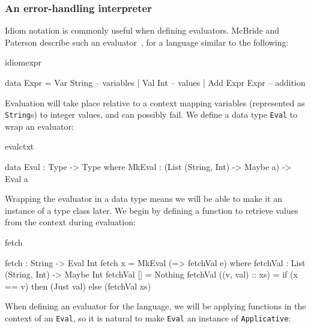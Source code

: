 \subsubsection{An error-handling interpreter}

Idiom notation is commonly useful when defining evaluators. McBride and
Paterson describe such an evaluator~\cite{idioms}, for a language similar to
the following:

\begin{SaveVerbatim}{idiomexpr}

data Expr = Var String      -- variables
          | Val Int         -- values
          | Add Expr Expr   -- addition

\end{SaveVerbatim}

\noindent
Evaluation will take place relative to a context mapping variables (represented as
\texttt{String}s) to integer values, and can possibly fail. We define a data type
\texttt{Eval} to wrap an evaluator:

\begin{SaveVerbatim}{evalctxt}

data Eval : Type -> Type where
     MkEval : (List (String, Int) -> Maybe a) -> Eval a

\end{SaveVerbatim}

\noindent
Wrapping the evaluator in a data type means we will be able to make it an instance
of a type class later. We begin by defining a function to retrieve values from
the context during evaluation:

\begin{SaveVerbatim}{fetch}

fetch : String -> Eval Int
fetch x = MkEval (\e => fetchVal e) where
    fetchVal : List (String, Int) -> Maybe Int
    fetchVal [] = Nothing
    fetchVal ((v, val) :: xs) = if (x == v) then (Just val) else (fetchVal xs)
  
\end{SaveVerbatim}
  
\noindent
When defining an evaluator for the language, we will be applying functions in the
context of an \texttt{Eval}, so it is natural to make \texttt{Eval} an instance
of \texttt{Applicative}:

\useverb{}

